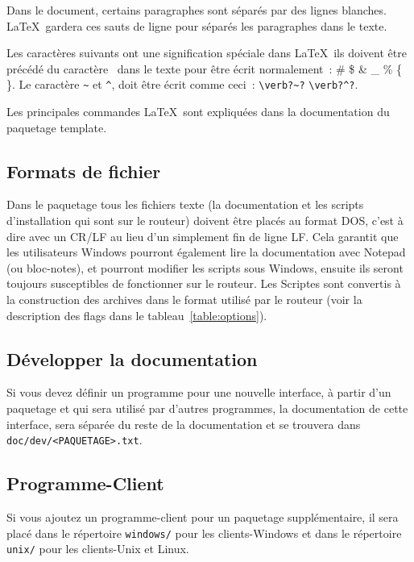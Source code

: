 Dans le document, certains paragraphes sont séparés par des lignes blanches. \LaTeX\
gardera ces sauts de ligne pour séparés les paragraphes dans le texte.

Les caractères suivants ont une signification spéciale dans \LaTeX\, ils
doivent être précédé du caractère \ dans le texte pour être écrit normalement~:
\# \$ \& \_ \% \{ \}. Le caractère \og{}\verb?~?\fg{} et \og{}\verb?^?\fg{}, doit
être écrit comme ceci~: \verb!\verb?~?! \verb!\verb?^?!.

Les principales commandes \LaTeX\ sont expliquées dans la documentation du paquetage
\og{}template\fg{}.


\subsection{Formats de fichier}

    Dans le paquetage tous les fichiers texte (la documentation et les scripts
    d’installation qui sont sur le routeur) doivent être placés au format DOS,
    c'est à dire avec un CR/LF au lieu d'un simplement fin de ligne LF. Cela garantit
	que les utilisateurs Windows pourront également lire la documentation avec
	\og{}Notepad\fg{} (ou bloc-notes), et pourront modifier les scripts sous Windows,
	ensuite ils seront toujours susceptibles de fonctionner sur le routeur.
    Les Scriptes sont convertis à la construction des archives dans le format
    utilisé par le routeur (voir la description des flags dans le tableau~\ref{table:options}).


\subsection{Développer la documentation}

    Si vous devez définir un programme pour une nouvelle interface, à partir
    d'un paquetage et qui sera utilisé par d'autres programmes, la documentation
    de cette interface, sera séparée du reste de la documentation et se trouvera
    dans \texttt{doc/dev/<PAQUETAGE>.txt}.


\subsection{Programme-Client}

    Si vous ajoutez un programme-client pour un paquetage supplémentaire,
    il sera placé dans le répertoire \texttt{windows/} pour les clients-Windows et
    dans le répertoire \texttt{unix/} pour les clients-Unix et Linux.


